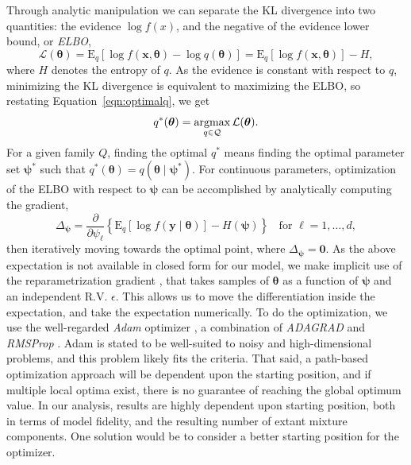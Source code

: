 Through analytic manipulation we can separate the KL divergence into two quantities: the 
    evidence $\log f(x)$, and the negative of the evidence lower bound, or \emph{ELBO},
    \begin{equation}
        \label{eqn:elbo}
        \mathcal{L}(\bm{\theta}) = 
            \text{E}_q\left[\log f(\bm{x},\bm{\theta}) - \log q(\bm{\theta})\right] 
                = \text{E}_q[\log f(\bm{x},\bm{\theta})] - H,
    \end{equation}
    where $H$ denotes the entropy of $q$.  As the evidence is constant with respect 
    to $q$, minimizing the KL divergence is equivalent to maximizing the ELBO, so 
    restating Equation~\eqref{eqn:optimalq}, we get
    \begin{equation}
        \label{eqn:optimalq2}
        q^*(\bm{\theta}) = \operatorname*{argmax}_{q\in\mathcal{Q}} \mathcal{L}(\bm{\theta}).
    \end{equation}
    For a given family $Q$, finding the optimal $q^*$ means finding the optimal parameter set 
    $\bm{\psi}^*$ such that $q^*(\bm{\theta}) = q(\bm{\theta}\mid\bm{\psi}^*)$.
    For continuous parameters, optimization of the ELBO with respect to $\bm{\psi}$ can be 
    accomplished by analytically computing the gradient,
    \begin{equation}
        \label{eqn:gradient}
        \Delta_{\bm{\psi}} = \frac{\partial}{\partial \psi_{\ell}}
            \left\lbrace\text{E}_{q}\left[\log f(\bm{y}\mid\bm{\theta})\right] 
                - H(\bm{\psi})\right\rbrace
            \;\;\text{ for }\ell = 1,\ldots,d, 
    \end{equation}
    then iteratively moving towards the optimal point, where $\Delta_{\bm{\psi}} = \bm{0}$.  
    As the above expectation is not available in closed form for our model, we make implicit 
    use of the reparametrization gradient \citep{kingma2022}, that takes samples of $\bm{\theta}$ 
    as a function of $\bm{\psi}$ and an independent R.V. $\epsilon$.  This allows us to move
    the differentiation inside the expectation, and take the expectation numerically.  To do 
    the optimization, we use the well-regarded \emph{Adam} optimizer \citep{kingma2017}, a combination of 
    \emph{ADAGRAD} \citep{duchi2011} and \emph{RMSProp} \citep{tieleman2012}.  Adam is stated to be 
    well-suited to noisy and high-dimensional problems, and this problem likely fits the criteria.
    That said, a path-based optimization approach will be dependent upon the starting position,
    and if multiple local optima exist, there is no guarantee of reaching the
    global optimum value.  In our analysis, results are highly dependent upon starting position, 
    both in terms of model fidelity, and the resulting number of extant mixture components.  
    One solution would be to consider a better starting position for the optimizer. 

